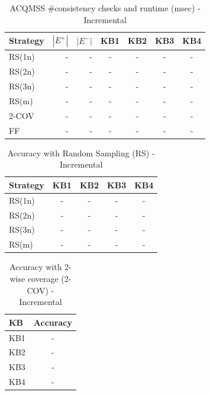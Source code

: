 \usepackage{booktabs}


\begin{table}[htbp]
\centering
\caption{ACQMSS \#consistency checks and runtime (msec) - Incremental}
\label{tab:table7_incremental}
\begin{tabular}{lrrcccc}
\toprule
Strategy & $|E^+|$ & $|E^-|$ & KB1 & KB2 & KB3 & KB4 \\
\midrule
RS(1n) & - & - & - & - & - & - \\
RS(2n) & - & - & - & - & - & - \\
RS(3n) & - & - & - & - & - & - \\
RS(m) & - & - & - & - & - & - \\
2-COV & - & - & - & - & - & - \\
FF & - & - & - & - & - & - \\
\bottomrule
\end{tabular}
\end{table}

\begin{table}[htbp]
\centering
\caption{Accuracy with Random Sampling (RS) - Incremental}
\label{tab:table9_incremental}
\begin{tabular}{lcccc}
\toprule
Strategy & KB1 & KB2 & KB3 & KB4 \\
\midrule
RS(1n) & - & - & - & - \\
RS(2n) & - & - & - & - \\
RS(3n) & - & - & - & - \\
RS(m) & - & - & - & - \\
\bottomrule
\end{tabular}
\end{table}

\begin{table}[htbp]
\centering
\caption{Accuracy with 2-wise coverage (2-COV) - Incremental}
\label{tab:table10_incremental}
\begin{tabular}{lc}
\toprule
KB & Accuracy \\
\midrule
KB1 & - \\
KB2 & - \\
KB3 & - \\
KB4 & - \\
\bottomrule
\end{tabular}
\end{table}

